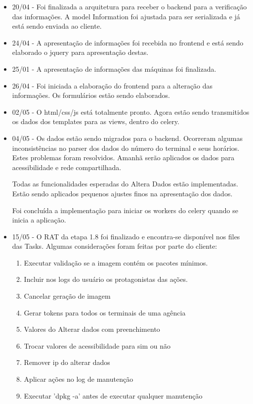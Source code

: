 \begin{itemize}
    \item 20/04 -
Foi finalizada a arquitetura para receber o backend para a verificação das informações. A model Information foi ajustada para ser serializada e já está sendo enviada ao cliente.


    \item 24/04 -
A apresentação de informações foi recebida no frontend e está sendo elaborado o jquery para apresentação destas.


    \item 25/01 -
A apresentação de informações das máquinas foi finalizada.


    \item 26/04 -
Foi iniciada a elaboração do frontend para a alteração das informações. Os formulários estão sendo elaborados.


    \item 02/05 -
O html/css/js está totalmente pronto. Agora estão sendo transmitidos os dados dos templates para as views, dentro do celery.


    \item 04/05 -
Os dados estão sendo migrados para o backend. Ocorreram algumas inconsistências no parser dos dados do número do terminal e seus horários. Estes problemas foram resolvidos. Amanhã serão aplicados os dados para acessibilidade e rede compartilhada.


Todas as funcionalidades esperadas do Altera Dados estão implementadas. Estão sendo aplicados pequenos ajustes finos na apresentação dos dados.


Foi concluída a implementação para iniciar os workers do celery quando se inicia a aplicação.


    \item 15/05 -
        O RAT da etapa 1.8 foi finalizado e encontra-se disponível nos files das Tasks.
Algumas considerações foram feitas por parte do cliente:

\begin{enumerate}
    \item Executar validação se a imagem contém os pacotes mínimos.
    \item Incluir nos logs do usuário os protagonistas das ações.
    \item Cancelar geração de imagem
    \item Gerar tokens para todos os terminais de uma agência
    \item Valores do Alterar dados com preenchimento
    \item Trocar valores de acessibilidade para sim ou não
    \item Remover ip do alterar dados
    \item Aplicar ações no log de manutenção
    \item Executar 'dpkg -a' antes de executar qualquer manutenção
\end{enumerate}
\end{itemize}
